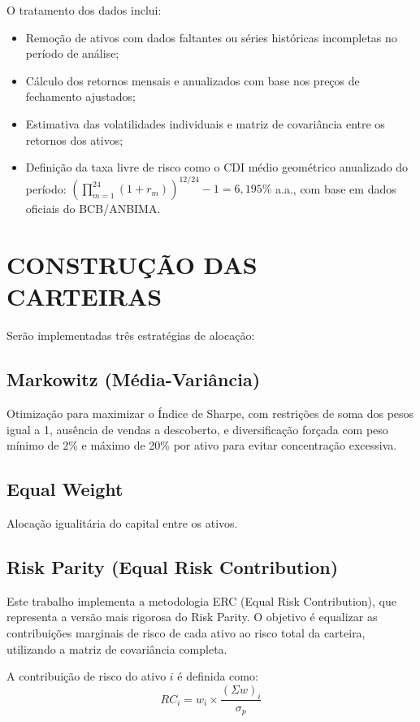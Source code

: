O tratamento dos dados inclui:

\begin{itemize}
    \item Remoção de ativos com dados faltantes ou séries históricas incompletas no período de análise;
    \item Cálculo dos retornos mensais e anualizados com base nos preços de fechamento ajustados;
    \item Estimativa das volatilidades individuais e matriz de covariância entre os retornos dos ativos;
    \item Definição da taxa livre de risco como o CDI médio geométrico anualizado do período: $\left(\prod_{m=1}^{24}(1+r_m)\right)^{12/24}-1 = 6,195\%$ a.a., com base em dados oficiais do BCB/ANBIMA.
\end{itemize}

\section{CONSTRUÇÃO DAS CARTEIRAS}

Serão implementadas três estratégias de alocação:

\subsection{Markowitz (Média-Variância)}
Otimização para maximizar o Índice de Sharpe, com restrições de soma dos pesos igual a 1, ausência de vendas a descoberto, e diversificação forçada com peso mínimo de 2\% e máximo de 20\% por ativo para evitar concentração excessiva.

\subsection{Equal Weight}
Alocação igualitária do capital entre os ativos.

\subsection{Risk Parity (Equal Risk Contribution)}
Este trabalho implementa a metodologia ERC (Equal Risk Contribution), que representa a versão mais rigorosa do Risk Parity. O objetivo é equalizar as contribuições marginais de risco de cada ativo ao risco total da carteira, utilizando a matriz de covariância completa.

A contribuição de risco do ativo $i$ é definida como:
\begin{equation}
RC_i = w_i \times \frac{(\Sigma w)_i}{\sigma_p}
\label{eq:risk_contribution}
\end{equation}


